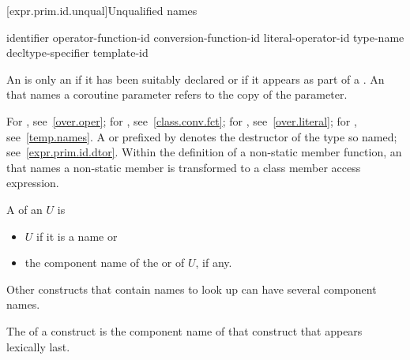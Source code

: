 [expr.prim.id.unqual]{Unqualified names}

\begin{bnf}
\br
    identifier\br
    operator-function-id\br
    conversion-function-id\br
    literal-operator-id\br
    \terminal{\~} type-name\br
    \terminal{\~} decltype-specifier\br
    template-id
\end{bnf}

\pnum
{}%
An  is only
an  if it has
been suitably declared
or if it appears as part of a .
An  that names a coroutine parameter
refers to the copy of the parameter.
\begin{note}
For , see~\ref{over.oper}; for
, see~\ref{class.conv.fct}; for
, see~\ref{over.literal}; for
, see~\ref{temp.names}.
A  or 
prefixed by \tcode{\~} denotes the destructor of the type so named;
see~\ref{expr.prim.id.dtor}.
Within the definition of a non-static member function, an
 that names a non-static member is transformed to a
class member access expression.
\end{note}

\pnum
A  of an  $U$ is
\begin{itemize}
\item
$U$ if it is a name or
\item
the component name of
the  or  of $U$, if any.
\end{itemize}
\begin{note}
Other constructs that contain names to look up can have several
component names.
\end{note}
The  of a construct is
the component name of that construct that appears lexically last.

